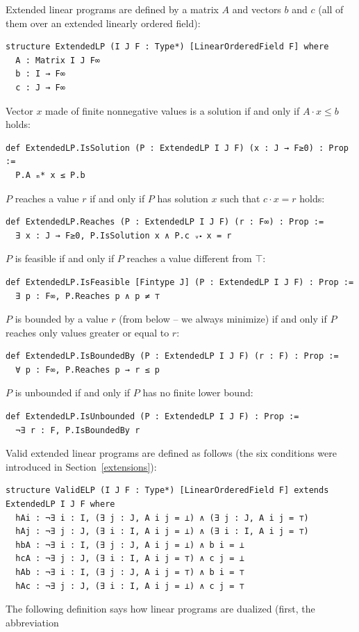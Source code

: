 \documentclass[]{article}
\renewcommand{\.}{\hskip .75pt}
\newcommand{\sekt}[1]{Section~\ref{#1}}
\let\*=\cdot
\begin{document}
Extended linear programs are defined by a matrix $A$ and vectors $b$ and $c$
(all of them over an extended linearly ordered field):
\begin{lstlisting}
structure ExtendedLP (I J F : Type*) [LinearOrderedField F] where
  A : Matrix I J F∞
  b : I → F∞
  c : J → F∞
\end{lstlisting}
Vector $x$ made of finite nonnegative values is a solution if and only if $A \* x \le b$
holds:
\begin{lstlisting}
def ExtendedLP.IsSolution (P : ExtendedLP I J F) (x : J → F≥0) : Prop :=
  P.A ₘ* x ≤ P.b
\end{lstlisting}
$P$ reaches a value $r$ if and only if $P$ has solution $x$ such that $c \* x = r$ holds:
\begin{lstlisting}
def ExtendedLP.Reaches (P : ExtendedLP I J F) (r : F∞) : Prop :=
  ∃ x : J → F≥0, P.IsSolution x ∧ P.c ᵥ⬝ x = r
\end{lstlisting}
$P$ is feasible if and only if $P$ reaches a value different from $\top$:
\begin{lstlisting}
def ExtendedLP.IsFeasible [Fintype J] (P : ExtendedLP I J F) : Prop :=
  ∃ p : F∞, P.Reaches p ∧ p ≠ ⊤
\end{lstlisting}
$P$ is bounded by a value $r$ (from below -- we always minimize) if and only if
$P$ reaches only values greater or equal to $r$:
\begin{lstlisting}
def ExtendedLP.IsBoundedBy (P : ExtendedLP I J F) (r : F) : Prop :=
  ∀ p : F∞, P.Reaches p → r ≤ p
\end{lstlisting}
$P$ is unbounded if and only if $P$ has no finite lower bound:
\begin{lstlisting}
def ExtendedLP.IsUnbounded (P : ExtendedLP I J F) : Prop :=
  ¬∃ r : F, P.IsBoundedBy r
\end{lstlisting}
Valid extended linear programs are defined as follows (the six conditions were
introduced in \sekt{extensions}):
\begin{lstlisting}
structure ValidELP (I J F : Type*) [LinearOrderedField F] extends ExtendedLP I J F where
  hAi : ¬∃ i : I, (∃ j : J, A i j = ⊥) ∧ (∃ j : J, A i j = ⊤)
  hAj : ¬∃ j : J, (∃ i : I, A i j = ⊥) ∧ (∃ i : I, A i j = ⊤)
  hbA : ¬∃ i : I, (∃ j : J, A i j = ⊥) ∧ b i = ⊥
  hcA : ¬∃ j : J, (∃ i : I, A i j = ⊤) ∧ c j = ⊥
  hAb : ¬∃ i : I, (∃ j : J, A i j = ⊤) ∧ b i = ⊤
  hAc : ¬∃ j : J, (∃ i : I, A i j = ⊥) ∧ c j = ⊤
\end{lstlisting}
The following definition says how linear programs are dualized (first, the abbreviation
\end{document}
